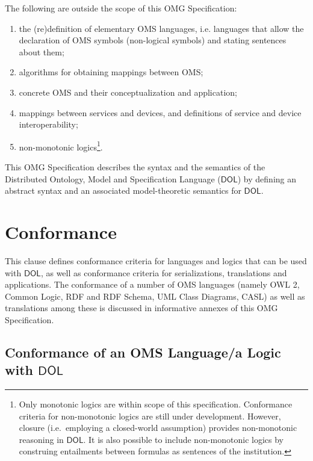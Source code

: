 \documentclass[10pt,fleqn,final]{scrreprt}
\makeatletter
\newcommand*{\ie}{i.e.\@\xspace}
\newcommand*\CommentAuthor{}
\renewcommand*\CommentAuthor{#1}}
\newcommand*\CommentDate{}
\renewcommand*\CommentDate{#1}}
\newcommand*\CommentId{}
\renewcommand*\CommentId{#1}}
\newcommand*\CommentType{}
\renewcommand*\CommentType{#1}}
\newcommand*{\SetCommentColorByType}[1]{%
\edef\localType{{#1}}%
\expandafter\ifstrequal\localType{q-aut}{\colorlet{CommentColor}{red}}{%
\expandafter\ifstrequal\localType{q-all}{\colorlet{CommentColor}{orange}}{%
\expandafter\ifstrequal\localType{todo}{\colorlet{CommentColor}{orange}}{%
\expandafter\ifstrequal\localType{fyi}{\colorlet{CommentColor}{lightgray}}{%
\colorlet{CommentColor}{yellow}}}}}}
\newcommand*{\SetCommentPrefixByType}[1]{%
\edef\localType{{#1}}%
\expandafter\@ifmtarg\localType{%
\edef\CommentPrefix{}%
}{%
\caseupper[q]{#1}%
\edef\CommentPrefix{\thestring: }%
}}
\newcommand*{\initComment}[1]{%
\setkeys{Comment}{#1}%
\SetCommentColorByType{\CommentType}%
\relax%
\SetCommentPrefixByType{\CommentType}%
\relax%
}
\newcommand*{\todonote}[2][]{%
\initComment{#1}%
\pdfcomment[author=\CommentAuthor,color=CommentColor,date=\CommentDate,id=\CommentId]{%
\CommentPrefix
#2}}
\renewcommand*{\todonote}[2][]{%
\initComment{#1}%
\ednote{\CommentPrefix #2}}
\newcommand*{\IS}{OMG Specification\xspace}
\newcommand*{\DOL}{\ensuremath{\mathsf{DOL}}\xspace}
\newcommand{\clause}[1]{\chapter{#1}}
\newcommand{\sclause}[1]{\section{#1}}
\makeatother
\begin{document}
The following are outside the scope of this \IS:
\begin{enumerate}
\item the (re)definition of elementary OMS languages, \ie languages that allow the declaration of OMS symbols (non-logical symbols) 
and
stating sentences about them;
\item algorithms for obtaining mappings between OMS;
\item concrete OMS and their conceptualization and application;
\item mappings between services and devices, and definitions of service and device interoperability;
\item non-monotonic logics\footnote{Only monotonic logics are within scope of this specification. Conformance criteria for non-monotonic logics are still under development. However, closure (i.e.\ employing a closed-world assumption) provides non-monotonic reasoning in \DOL. It is also possible to include non-monotonic logics by construing entailments between formulas as sentences of the institution.}. 

\end{enumerate}

This \IS describes the syntax and the semantics of the Distributed Ontology, Model and
Specification Language (\DOL) by defining an abstract syntax and an associated model-theoretic
semantics for \DOL. 


\clause{Conformance}\label{c:conformance}
This clause defines conformance criteria for languages and logics that can be used with \DOL, as well as conformance criteria for
serializations, translations and applications. The conformance of a
number of OMS languages (namely OWL 2, Common Logic, RDF and RDF Schema, UML Class Diagrams, CASL) as well as translations among
these is discussed in informative annexes of this \IS.



\sclause{Conformance of an OMS Language/a Logic with \DOL}\label{c:conform:logic}
\end{document}
